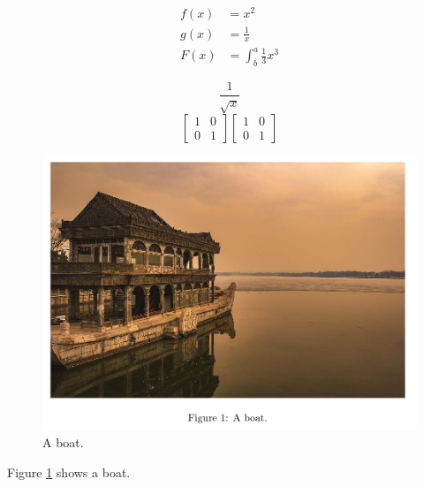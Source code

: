 \documentclass{article}
\begin{document}
	\begin{align}
		f(x) &= x^2\\
		g(x) &= \frac{1}{x}\\
		F(x) &= \int^a_b \frac{1}{3}x^3
	\end{align}

	$$\frac{1}{\sqrt{x}}$$
	\begin{equation*}
	\left[
	\begin{matrix}
	1 & 0\\
	0 & 1
	\end{matrix}
	\right]
	[
	\begin{matrix}
	1 & 0\\
	0 & 1
	\end{matrix}
	]
	\end{equation*}

	\begin{figure}[h!]
	  \includegraphics[width=\linewidth]{boat.png}
	  \caption{A boat.}
	  \label{fig:boat1}
	\end{figure}

	Figure \ref{fig:boat1} shows a boat.
\end{document}
